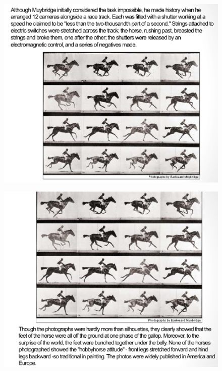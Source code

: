\documentclass{beamer}
\begin{document}
\begin{frame}
	\begin{figure}
		\centering
		\includegraphics[scale=0.4]{98.jpg}
	\end{figure}
\end{frame}
\begin{frame}
	\begin{figure}
		\centering
		\includegraphics[scale=0.4]{99.jpg}
	\end{figure}
\end{frame}
\end{document}
